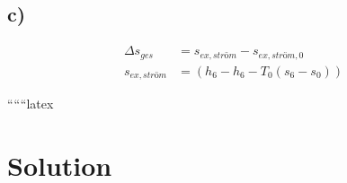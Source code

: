 

\subsection*{c)}

\begin{align*}
    \Delta s_{ges} &= s_{ex, ström} - s_{ex, ström, 0} \\
    s_{ex, ström} &= (h_6 - h_6 - T_0 (s_6 - s_0))
\end{align*}

``````latex


\section*{Solution}